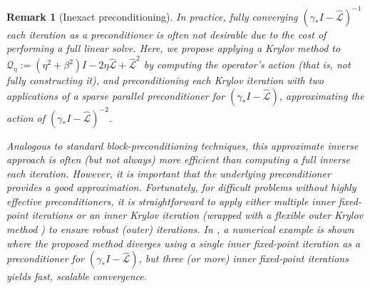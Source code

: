 \documentclass[a4paper,10pt]{article}
\newtheorem{remark}{Remark}
\begin{document}
\begin{remark}[Inexact preconditioning]\label{sec:inexact-precond}
In practice, fully converging $(\gamma_* I - \widehat{\mathcal{L}})^{-1}$
each iteration as a preconditioner is often not desirable due to the cost
of performing a full linear solve. Here, we propose
applying a Krylov method to $\mathcal{Q}_\eta:=(\eta^2+\beta^2)I - 2\eta\widehat{\mathcal{L}} +
\widehat{\mathcal{L}}^2$ by computing the operator's action (that is, not fully constructing
it), and preconditioning each Krylov iteration with \textit{two} applications of a sparse
parallel preconditioner for $(\gamma_* I - \widehat{\mathcal{L}})$, approximating the action
of $(\gamma_* I - \widehat{\mathcal{L}})^{-2}$.

Analogous to standard block-preconditioning techniques, this approximate inverse
approach is often (but not always) more efficient than computing a full inverse
each iteration. However, \textit{it is important that the underlying preconditioner
provides a good approximation}.
Fortunately, for difficult problems without highly effective
preconditioners, it is straightforward to apply either multiple inner fixed-point iterations
or an inner Krylov iteration (wrapped with a flexible outer Krylov method
\cite{Notay2000,saad1993flexible}) to ensure robust (outer) iterations.
In , a
numerical example is shown where the proposed method diverges using a single inner
fixed-point iteration as a preconditioner for $(\gamma_* I - \widehat{\mathcal{L}})$, but
three (or more) inner fixed-point iterations yields fast, scalable convergence. 
\end{remark}
\end{document}
